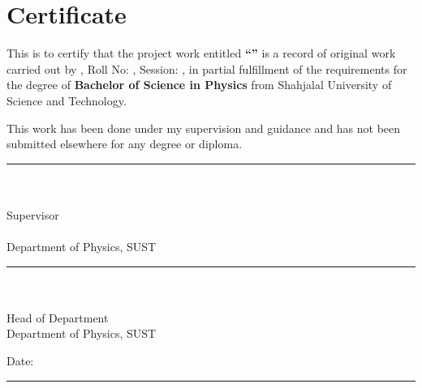 
\chapter*{Certificate}

This is to certify that the project work entitled \textbf{``\printtitle''} is a record of original work carried out by \textbf{\printauthor}, Roll No: \textbf{\printroll}, Session: \textbf{\printsession}, in partial fulfillment of the requirements for the degree of \textbf{Bachelor of Science in Physics} from Shahjalal University of Science and Technology.

This work has been done under my supervision and guidance and has not been submitted elsewhere for any degree or diploma.

\vspace{1.5in}

\noindent
\begin{minipage}[t]{0.45\textwidth}
    \centering
    \rule{6cm}{0.4pt} \\
    \textbf{\printsupervisor} \\
    Supervisor \\
    \printsupervisordesig \\
    Department of Physics, SUST
\end{minipage}
\hfill
\begin{minipage}[t]{0.45\textwidth}
    \centering
    \rule{6cm}{0.4pt} \\
    \textbf{\printhead} \\
    Head of Department \\
    Department of Physics, SUST
\end{minipage}

\vspace{1.0in}
\noindent
Date: \rule{4cm}{0.4pt}

